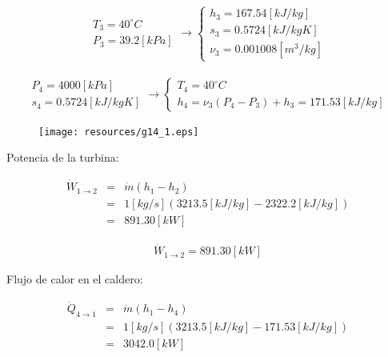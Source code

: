 \documentclass[letter,10pt]{article}
\begin{document}
\begin{enumerate}
\begin{eqnarray*}
    \begin{array}{c}
        T_3 = 40^\circ C \\
        P_3 = 39.2[kPa]
    \end{array}
    \rightarrow
    \begin{cases}
        h_3 = 167.54[kJ/kg] \\
        s_3 = 0.5724[kJ/kg K] \\
        \nu_3 = 0.001008[m^3/kg]
    \end{cases}
\end{eqnarray*}

\begin{eqnarray*}
    \begin{array}{c}
        P_4 = 4000[kPa] \\
        s_4 = 0.5724[kJ/kg K]
    \end{array}
    \rightarrow
    \begin{cases}
        T_4 = 40^\circ C \\
        h_4 = \nu_3 (P_4 - P_3) + h_3 = 171.53[kJ/kg]
    \end{cases}
\end{eqnarray*}

\begin{figure}[H]
\centering
\texttt{[image: resources/g14\_1.eps]}
\end{figure}

Potencia de la turbina:

\begin{eqnarray*}
    \dot{W}_{1\rightarrow2} &=& \dot{m}(h_1 - h_2) \\
                            &=& 1[kg/s](3213.5[kJ/kg]-2322.2[kJ/kg]) \\
                            &=& 891.30[kW]
\end{eqnarray*}

\begin{equation*}
\boxed{
    \begin{array}{l}
        \dot{W}_{1\rightarrow2} = 891.30[kW]
    \end{array}
}
\end{equation*}

Flujo de calor en el caldero:

\begin{eqnarray*}
    \dot{Q}_{4\rightarrow1} &=& \dot{m}(h_1 - h_4) \\
                            &=& 1[kg/s](3213.5[kJ/kg]-171.53[kJ/kg]) \\
                            &=& 3042.0[kW]
\end{eqnarray*}


\end{enumerate}
\end{document}
